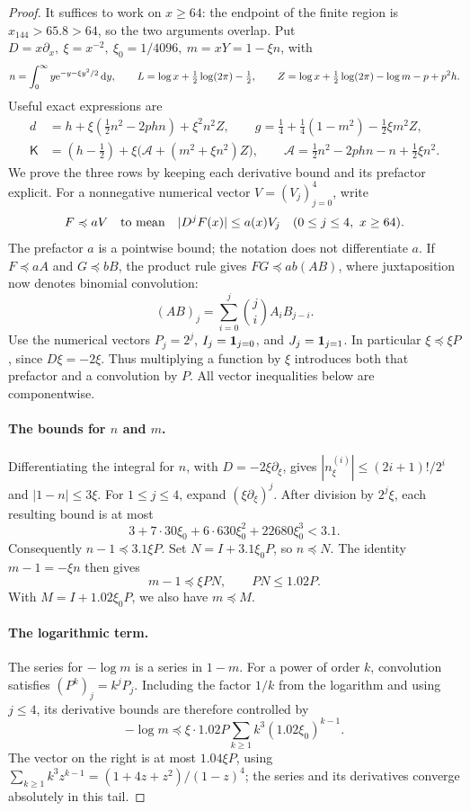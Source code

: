 \begin{proof}
It suffices to work on $x\ge64$: the endpoint of the finite region is $x_{144}>65.8>64$, so the two arguments overlap. Put $D=x\partial_x,\ \xi=x^{-2},\ \xi_0=1/4096,\ m=xY=1-\xi n$, with
\[
 n=\int_0^\infty y \mathrm{e}^{-y-\xi y^2/2}\,\mathrm{d} y,\qquad L=\log x+\tfrac12\log(2\pi)-\tfrac12,\qquad
 Z=\log x+\tfrac12\log(2\pi)-\log m-p+p^2h.
\]
Useful exact expressions are
\[
\begin{aligned}
 d&=h+\xi(\tfrac12 n^2-2p h n)+\xi^2 n^2 Z,\qquad
 g=\tfrac14+\tfrac14(1-m^2)-\tfrac12 \xi m^2 Z,\\
 \mathsf K&=(h-\tfrac12)+\xi\big(\mathcal{A}+(m^2+\xi n^2)Z\big),\qquad
 \mathcal{A}=\tfrac12 n^2-2p h n-n+\tfrac12\xi n^2 .
\end{aligned}
\]
We prove the three rows by keeping each derivative bound and its prefactor explicit. For a nonnegative numerical vector $V=(V_j)_{j=0}^4$, write
\[
 F\preccurlyeq aV
 \quad\hbox{to mean}\quad
 |D^jF(x)|\le a(x)V_j
 \quad(0\le j\le4,\ x\ge64).
\]
The prefactor $a$ is a pointwise bound; the notation does not differentiate $a$. If $F\preccurlyeq aA$ and $G\preccurlyeq bB$, the product rule gives $FG\preccurlyeq ab(AB)$, where juxtaposition now denotes binomial convolution:
\[
 (AB)_j=\sum_{i=0}^j\binom ji A_iB_{j-i}.
\]
Use the numerical vectors $P_j=2^j$, $I_j={\bf1}_{j=0}$, and $J_j={\bf1}_{j=1}$. In particular $\xi\preccurlyeq\xi P$, since $D\xi=-2\xi$. Thus multiplying a function by $\xi$ introduces both that prefactor and a convolution by $P$. All vector inequalities below are componentwise.

\paragraph{The bounds for $n$ and $m$.}
Differentiating the integral for $n$, with $D=-2\xi\partial_\xi$, gives $|n^{(i)}_\xi|\le(2i+1)!/2^i$ and $|1-n|\le3\xi$. For $1\le j\le4$, expand $(\xi\partial_\xi)^j$. After division by $2^j\xi$, each resulting bound is at most
\[
 3+7\cdot30\xi_0+6\cdot630\xi_0^2+22680\xi_0^3<3.1.
\]
Consequently $n-1\preccurlyeq3.1\xi P$. Set $N=I+3.1\xi_0P$, so $n\preccurlyeq N$. The identity $m-1=-\xi n$ then gives
\[
 m-1\preccurlyeq\xi PN,\qquad PN\le1.02P.
\]
With $M=I+1.02\xi_0P$, we also have $m\preccurlyeq M$.

\paragraph{The logarithmic term.}
The series for $-\log m$ is a series in $1-m$. For a power of order $k$, convolution satisfies $(P^k)_j=k^jP_j$. Including the factor $1/k$ from the logarithm and using $j\le4$, its derivative bounds are therefore controlled by
\[
 -\log m\preccurlyeq
 \xi\cdot1.02P\sum_{k\ge1}k^3(1.02\xi_0)^{k-1}.
\]
The vector on the right is at most $1.04\xi P$, using $\sum_{k\ge1}k^3z^{k-1}=(1+4z+z^2)/(1-z)^4$; the series and its derivatives converge absolutely in this tail.


\end{proof}
